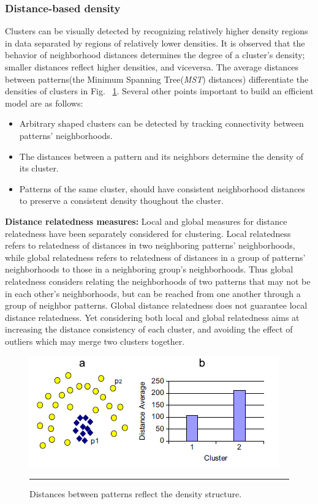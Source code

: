 \subsubsection{Distance-based density}\label{subsec:dist_density} 
Clusters can be visually detected by recognizing relatively higher density regions in data separated by regions of relatively lower densities. It is observed that the behavior of neighborhood distances determines the degree of a cluster's density; smaller distances reflect higher densities, and viceversa. The average distances between patterns(the Minimum
Spanning Tree(\textit{MST}) distances) differentiate the densities of clusters in Fig. ~\ref{fig:mitosis_1}. Several other points important to build an efficient model are as follows:
\begin{itemize}
\item Arbitrary shaped clusters can be detected by tracking connectivity between patterns' neighborhoods.
\item The distances between a pattern and its neighbors determine the density of its cluster.
\item Patterns of the same cluster, should have consistent neighborhood distances to preserve a consistent density thoughout the cluster.
\end{itemize}
\textbf{Distance relatedness measures:} Local and global measures for distance relatedness have been separately considered for clustering. Local relatedness refers to relatedness of distances in two neighboring patterns' neighborhoods, while global relatedness refers to relatedness of distances in a group of patterns' neighborhoods to those in a neighboring group's neighborhoods. Thus global relatedness considers relating the neighborhoods of two patterns that may not be in each other's neighborhoods, but can be reached from one another through a group of neighbor patterns. Global distance relatedness does not guarantee local distance relatedness. Yet considering both local and global relatedness aims at increasing the distance consistency of each cluster, and avoiding the effect of outliers which may merge two clusters together.

\begin{figure}[htbp]
	\centering
		\includegraphics{./Figures/Mitosis_1.png}
		\rule{35em}{0.5pt}
	\caption[Distances between patterns reflect the density structure.]{Distances between patterns reflect the density structure.}
	\label{fig:mitosis_1}
\end{figure}


